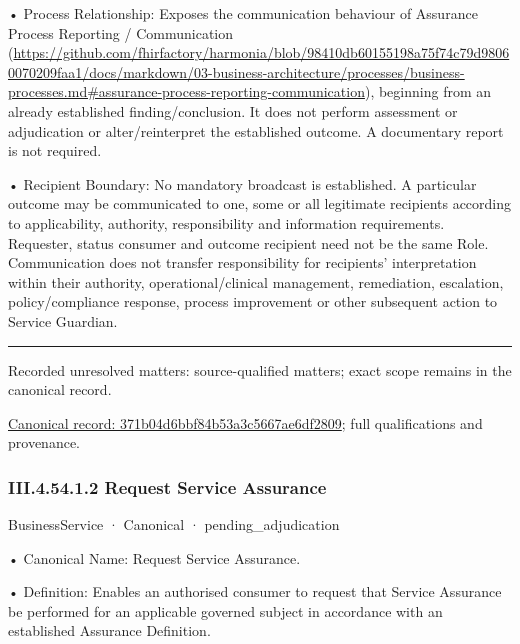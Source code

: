 •
Process Relationship: Exposes the communication behaviour of Assurance Process Reporting / Communication (\url{https://github.com/fhirfactory/harmonia/blob/98410db60155198a75f74c79d98060070209faa1/docs/markdown/03-business-architecture/processes/business-processes.md#assurance-process-reporting-communication}), beginning from an already established finding/conclusion. It does not perform assessment or adjudication or alter/reinterpret the established outcome. A documentary report is not required.



•
Recipient Boundary: No mandatory broadcast is established. A particular outcome may be communicated to one, some or all legitimate recipients according to applicability, authority, responsibility and information requirements. Requester, status consumer and outcome recipient need not be the same Role. Communication does not transfer responsibility for recipients' interpretation within their authority, operational/clinical management, remediation, escalation, policy/compliance response, process improvement or other subsequent action to Service Guardian.



\medskip\hrule\medskip

{\small Recorded unresolved matters: source-qualified matters; exact scope remains in the canonical record.}\par
{\footnotesize \href{../../../../continuum/business/business-service/371b04d6bbf84b53a3c5667ae6df2809.md}{Canonical record: 371b04d6bbf84b53a3c5667ae6df2809}; full qualifications and provenance.}\par
\subsubsection*{III.4.54.1.2 Request Service Assurance}
\label{navigation:III.4.54.1.2}

\label{element:a76c0be369744fcfb5eb91b90c9b59e7}
{\small BusinessService · Canonical · pending\_adjudication}\par

•
Canonical Name: Request Service Assurance.



•
Definition: Enables an authorised consumer to request that Service Assurance be performed for an applicable governed subject in accordance with an established Assurance Definition.



